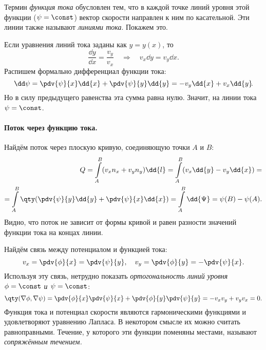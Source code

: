 Термин \textit{функция тока} обусловлен тем, что в каждой точке линий уровня этой функции ($\psi=\const$) вектор скорости направлен к ним по касательной. Эти линии также называют \textit{линиями тока}. Покажем это.

Если уравнения линий тока заданы как $y=y(x)$, то
\begin{equation}
    \frac{\dd{y}}{\dd{x}} = \frac{v_y}{v_x}
    \quad\Rightarrow\quad
    v_x \dd{y} = v_y \dd{x}\!.
\end{equation}
Распишем формально дифференциал функции тока:
\begin{equation}
    \dd\psi = \pdv{\psi}{x}\dd{x} + \pdv{\psi}{y}\dd{y} =
    -v_y \dd{x} + v_x \dd{y}\!.
\end{equation}
Но в силу предыдущего равенства эта сумма равна нулю. Значит, на линии тока $\psi = \const$.

\paragraph{Поток через функцию тока.} Найдём поток через плоскую
кривую, соединяющую точки $A$ и $B$:
\begin{equation}
    \begin{aligned}
        Q = \int\limits_A^B (v_x n_x + v_y n_y)\dd{l}=
        \int\limits_A^B (v_x \dd{y} - v_y \dd{x})=\\=
        \int\limits_A^B \qty(\pdv{\psi}{y}\dd{y}+\pdv{\psi}{x}\dd{x})=
        \int\limits_A^B \dd{\Psi} = \psi(B)-\psi(A).
    \end{aligned}
\end{equation}
Видно, что поток не зависит от формы кривой и равен разности значений функции тока на концах линии.

Найдём связь между потенциалом и функцией тока:
\begin{equation}
    v_x = \pdv{\phi}{x}= \pdv{\psi}{y}, \quad
    v_y = \pdv{\phi}{y} = -\pdv{\psi}{x}.
\end{equation}
Используя эту связь, нетрудно показать \textit{ортогональность линий уровня $\phi=\const$ и $\psi=\const$}:
\begin{equation}
    \qty(\nabla\phi,\nabla\psi) =
    \pdv{\phi}{x}\pdv{\psi}{x} +
    \pdv{\phi}{y}\pdv{\psi}{y} = -v_x v_y+ v_y v_x = 0.
\end{equation}
Функция тока и потенциал скорости являются гармоническими функциями и удовлетворяют уравнению Лапласа.
В некотором смысле их можно считать равноправными. Течение, у которого эти функции поменяны местами, называют \textit{сопряжённым течением.}


